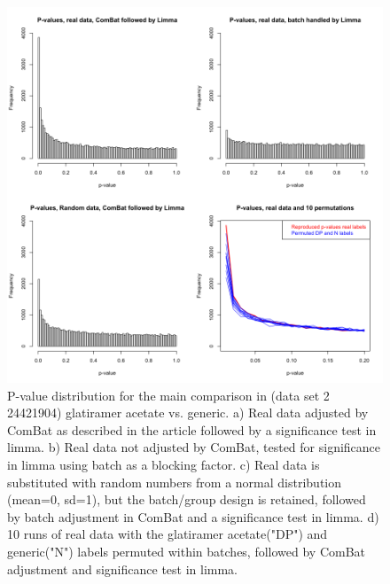 \documentclass{bio}
\begin{document}
\begin{figure}[!p]
\centering\includegraphics[width=13cm]{Fig/pvaluestowfic.png}
\caption{
P-value distribution for the main comparison in (data set 2 24421904) glatiramer acetate vs. generic.  
a) Real data adjusted by ComBat as described in the article followed by a significance test in limma. 
b) Real data not adjusted by ComBat, tested for significance in limma using batch as a blocking factor. 
c) Real data is substituted with random numbers from a normal distribution (mean=0, sd=1), but the batch/group design is retained, followed by batch adjustment in ComBat and a significance test in limma.
d) 10 runs of real data with the glatiramer acetate("DP") and generic("N") labels permuted within batches, followed by ComBat adjustment and significance test in limma.  
}
\label{p-towfic}
\end{figure}
\end{document}
